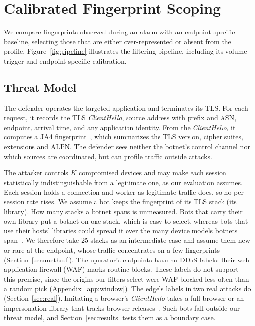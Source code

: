 \documentclass[conference,letterpaper,10pt]{IEEEtran}
\newcommand\1{\textit{(i)}}
\newcommand\2{\textit{(ii)}}
\newcommand\3{\textit{(iii)}}
\newcommand\4{\textit{(iv)}}
\newcommand\5{\textit{(v)}}
\newcommand\6{\textit{(vi)}}
\newcommand\7{\textit{(vii)}}
\newcommand\8{\textit{(viii)}}
\newcommand\9{\textit{(ix)}}
\begin{document}

\section{Calibrated Fingerprint Scoping}
\label{sec:approach}

We compare fingerprints observed during an alarm with an endpoint-specific baseline, selecting those that are either over-represented or absent from the profile. Figure~\ref{fig:pipeline} illustrates the filtering pipeline, including its volume trigger and endpoint-specific calibration.

\subsection{Threat Model}
\label{sec:threat}

The defender operates the targeted application and terminates its TLS.
For each request, it records the TLS \textit{ClientHello},
source address with prefix and ASN, endpoint,
arrival time, and any application identity.
From the \textit{ClientHello}, it computes a JA4
fingerprint~\cite{althouse2023ja4}, which summarizes
the TLS version, cipher suites, extensions and ALPN. 
The defender sees neither the botnet's control channel nor which
sources are coordinated, but can profile traffic outside attacks.

The attacker controls $K$ compromised devices and
may make each session statistically indistinguishable
from a legitimate one, as our evaluation assumes. Each session holds a connection and worker as
legitimate traffic does, so no per-session rate rises. We assume a bot keeps the fingerprint of its TLS stack (its library). How many stacks a botnet spans is unmeasured. Bots that carry their own library put a botnet on one stack, which is easy to select, whereas bots that use their hosts' libraries could spread it over the many device models botnets span~\cite{antonakakis2017mirai}. We therefore take 25 stacks as an intermediate case and assume them new or rare at the endpoint, whose traffic concentrates on a few fingerprints (Section~\ref{sec:method}). The operator's endpoints have no DDoS labels: their web application firewall (WAF) marks routine blocks. These labels do not support this premise, since the origins our filters select were WAF-blocked less often than a random pick (Appendix~\ref{app:window}). The edge's labels in two real attacks do (Section~\ref{sec:real}).
Imitating a browser's \textit{ClientHello} takes a full
browser or an impersonation library that tracks browser releases~\cite{frolov2019tls}. Such bots fall outside our threat model, and Section~\ref{sec:results} tests them as a boundary case.
\end{document}
